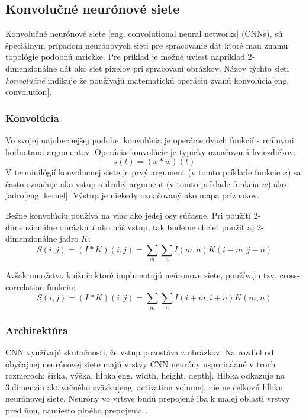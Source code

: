 \subsection{Konvolučné neurónové siete}
Konvolučné neurónové siete [eng. convolutional neural networks] (CNNs), sú špeciálnym prípadom neurónových sieti pre spracovanie
    dát ktoré mau známu topológie podobnú mriežke.
Pre príklad je možné uviesť napríklad 2-dimenzionálne dát ako sieť pixelov pri spracovaní obrázkov.
Názov týchto sieti \textit{konvolučné} indikuje že používajú matematickú operáciu zvanú konvolúcia[eng. convolution]\cite{book:Goodfellow-et-al-2016}.

\subsubsection{Konvolúcia}
Vo svojej najobecnejšej podobe, konvolúcia je operácie dvoch funkcií s reálnymi hodnotami argumentov.
Operácia konvolúcie je typicky označovaná hviezdičkov:
\begin{equation}
    s(t) = (x * w)(t)
\end{equation}
V terminilógií konvolucnej siete je prvý argument (v tomto príklade funkcie $x$) sa často označuje ako vstup a druhý
    argument (v tomto príklade funkcia $w$) ako jadro[eng. kernel]. Výstup je niekedy označovaný ako mapa príznakov.

Bežne konvolúciu používa na viac ako jedej osy súčasne.
Pri použítí 2-dimenzionálne obrázku $I$ ako náš vstup, tak budeme chcieť použiť aj 2-dimenzionálne jadro $K$\cite{book:Goodfellow-et-al-2016}:
\begin{equation}
    S(i,j) = (I * K)(i, j) = \sum_m \sum_n I(m,n) K(i - m, j - n)
\end{equation}

Avšak množstvo knižníc ktoré implmentujú neúronove siete, používaju tzv. cross-correlation funkciu\cite{book:Goodfellow-et-al-2016}:
\begin{equation}
    S(i,j) = (I * K)(i, j) = \sum_m \sum_n I(i + m, i + n) K(m, n)
\end{equation}

\subsubsection{Architektúra}
CNN využívajú skutočnosti, že vstup pozostáva z obrázkov.
Na rozdiel od obyčajnej neurónovej siete majú vrstvy CNN neuróny usporiadané v troch rozmeroch: šírka, výška, hĺbka[eng. width, height, depth].
Hĺbka odkazuje na 3.dimenziu aktivačného zväzku[eng. activation volume], nie ne celkovú hĺbku neurónovej siete.
Neuróny vo vrtsve budú prepojené iba k malej oblasti vrstvy pred ňou, namiesto plného prepojenia \cite{odkaz:CNNArchitecture}.

